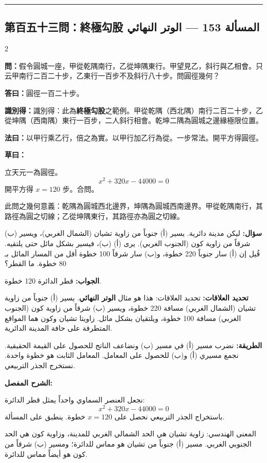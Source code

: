 \documentclass[11pt,a4paper]{article}
\newcommand{\ar}[1]{\arabicfont\beginR #1\endR}
\newcommand{\arb}[1]{\textbf{\arabicfont\beginR #1\endR}}
\newcommand{\longline}{\noindent\rule{\textwidth}{0.4pt}}
\newcommand{\arnote}[1]{\textcolor{arabicblue}{\ar{#1}}}
\newcommand{\wen}[1]{\par\noindent\textbf{\textcolor{probcolor}{問：}}{#1}\par}
\newcommand{\da}[1]{\par\noindent\textbf{\textcolor{anscolor}{答曰：}}{#1}\par}
\newcommand{\fayue}[1]{\par\noindent\textbf{\textcolor{methodcolor}{法曰：}}{#1}\par}
\newcommand{\caoyue}[1]{\par\noindent\textbf{草曰：}{#1}\par}
\newcommand{\zhi}[1]{\par\noindent\textbf{識別得：}{#1}\par}
\newcommand{\arwen}[1]{\par\noindent\arb{سؤال: }\arnote{#1}\par}
\newcommand{\arjwb}[1]{\par\noindent\arb{الجواب: }\arnote{#1}\par}
\newcommand{\arqwd}[1]{\par\noindent\arb{الطريقة: }\arnote{#1}\par}
\newcommand{\arshr}[1]{\par\noindent\arb{الشرح المفصل: }\arnote{#1}\par}
\newcommand{\arfl}[1]{\par\noindent\arb{تحديد العلاقات: }\arnote{#1}\par}
\begin{document}
\vspace{0.3cm}
\longline

\subsection*{第百五十三問：終極勾股 \hfill \ar{المسألة 153 — الوتر النهائي}}

\begin{paracol}{2}

\begin{leftcolumn}
\wen{假令圓城一座，甲從乾隅南行，乙從坤隅東行。甲望見乙，斜行與乙相會。只云甲南行二百二十步，乙東行一百步不及斜行八十步。問圓徑幾何？}

\da{圓徑一百二十步。}

\zhi{識別得：此為\textbf{終極勾股}之範例。甲從乾隅（西北隅）南行二百二十步，乙從坤隅（西南隅）東行一百步，二人斜行相會。乾坤二隅為圓城之邊緣極限位置。}

\fayue{以甲行乘乙行，倍之為實。以甲行加乙行為從。一步常法。開平方得圓徑。}

\caoyue{
立天元一為圓徑。
$$x^2 + 320x - 44000 = 0$$
開平方得 $x = 120$ 步。合問。

此問之幾何意義：乾隅為圓城西北邊界，坤隅為圓城西南邊界。甲從乾隅南行，其路徑為圓之切線；乙從坤隅東行，其路徑亦為圓之切線。}
\end{leftcolumn}

\begin{rightcolumn}
\arwen{ليكن مدينة دائرية. يسير (أ) جنوباً من زاوية تشيان (الشمال الغربي)، ويسير (ب) شرقاً من زاوية كون (الجنوب الغربي). يرى (أ) (ب)، فيسير بشكل مائل حتى يلتقيه. قُيل إن (أ) سار جنوباً 220 خطوة، و(ب) سار شرقاً 100 خطوة أقل من المسار المائل بـ 80 خطوة. ما القطر؟}

\arjwb{قطر الدائرة 120 خطوة.}

\arfl{تحديد العلاقات: هذا هو مثال \textbf{الوتر النهائي}. يسير (أ) جنوباً من زاوية تشيان (الشمال الغربي) مسافة 220 خطوة، ويسير (ب) شرقاً من زاوية كون (الجنوب الغربي) مسافة 100 خطوة، ويلتقيان بشكل مائل. زاويتا تشيان وكون هما المواقع المتطرفة على حافة المدينة الدائرية.}

\arqwd{نضرب مسير (أ) في مسير (ب) ونضاعف الناتج للحصول على القيمة الحقيقية. نجمع مسيري (أ) و(ب) للحصول على المعامل. المعامل الثابت هو خطوة واحدة. نستخرج الجذر التربيعي.}

\arshr{نجعل العنصر السماوي واحداً يمثل قطر الدائرة:
$$x^2 + 320x - 44000 = 0$$
باستخراج الجذر التربيعي نحصل على $x = 120$ خطوة. ينطبق على المسألة.

المعنى الهندسي: زاوية تشيان هي الحد الشمالي الغربي للمدينة، وزاوية كون هي الحد الجنوبي الغربي. مسير (أ) جنوباً من تشيان هو مماس للدائرة؛ ومسير (ب) شرقاً من كون هو أيضاً مماس للدائرة.}
\end{rightcolumn}

\end{paracol}
\end{document}
